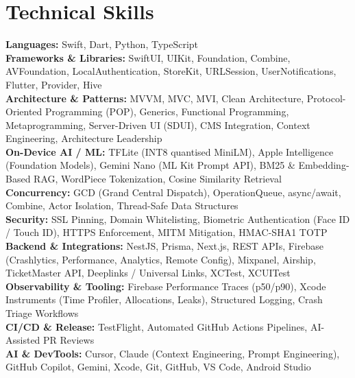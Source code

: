 \documentclass[letterpaper,10.4pt]{article}
\begin{document}
\section{Technical Skills}
\begin{itemize}[leftmargin=0.17in, label={}, topsep=2pt, itemsep=2pt]
  \small{\item{
    \textbf{Languages:} Swift, Dart, Python, TypeScript \\[3pt]
    \textbf{Frameworks \& Libraries:} SwiftUI, UIKit, Foundation, Combine, AVFoundation, LocalAuthentication, StoreKit, URLSession, UserNotifications, Flutter, Provider, Hive \\[3pt]
    \textbf{Architecture \& Patterns:} MVVM, MVC, MVI, Clean Architecture, Protocol-Oriented Programming (POP), Generics, Functional Programming, Metaprogramming, Server-Driven UI (SDUI), CMS Integration, Context Engineering, Architecture Leadership \\[3pt]
    \textbf{On-Device AI / ML:} TFLite (INT8 quantised MiniLM), Apple Intelligence (Foundation Models), Gemini Nano (ML Kit Prompt API), BM25 \& Embedding-Based RAG, WordPiece Tokenization, Cosine Similarity Retrieval \\[3pt]
    \textbf{Concurrency:} GCD (Grand Central Dispatch), OperationQueue, async/await, Combine, Actor Isolation, Thread-Safe Data Structures \\[3pt]
    \textbf{Security:} SSL Pinning, Domain Whitelisting, Biometric Authentication (Face ID / Touch ID), HTTPS Enforcement, MITM Mitigation, HMAC-SHA1 TOTP \\[3pt]
    \textbf{Backend \& Integrations:} NestJS, Prisma, Next.js, REST APIs, Firebase (Crashlytics, Performance, Analytics, Remote Config), Mixpanel, Airship, TicketMaster API, Deeplinks / Universal Links, XCTest, XCUITest \\[3pt]
    \textbf{Observability \& Tooling:} Firebase Performance Traces (p50/p90), Xcode Instruments (Time Profiler, Allocations, Leaks), Structured Logging, Crash Triage Workflows \\[3pt]
    \textbf{CI/CD \& Release:} TestFlight, Automated GitHub Actions Pipelines, AI-Assisted PR Reviews \\[3pt]
    \textbf{AI \& DevTools:} Cursor, Claude (Context Engineering, Prompt Engineering), GitHub Copilot, Gemini, Xcode, Git, GitHub, VS Code, Android Studio
  }}
\end{itemize}
\end{document}
